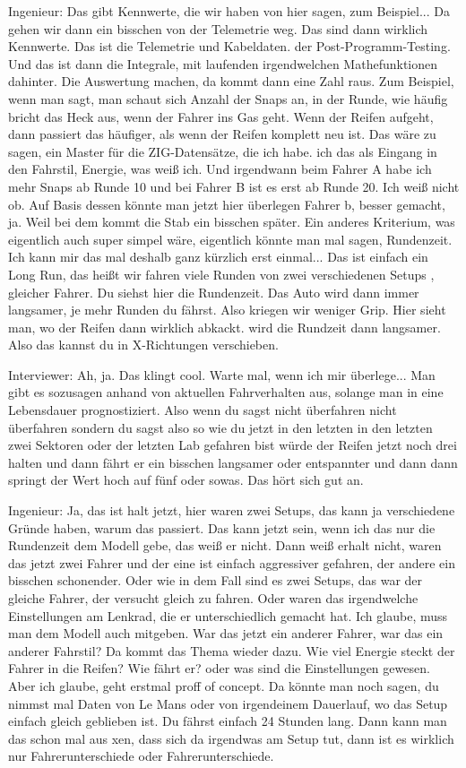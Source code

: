 Ingenieur: 
Das gibt Kennwerte, die wir haben von hier sagen, zum Beispiel...   Da gehen wir dann ein bisschen von der Telemetrie weg. Das sind dann wirklich Kennwerte. Das ist die Telemetrie und Kabeldaten. der Post-Programm-Testing. Und das ist dann die Integrale, mit laufenden irgendwelchen Mathefunktionen dahinter. Die Auswertung machen, da kommt dann eine Zahl raus. Zum Beispiel, wenn man sagt, man schaut sich Anzahl der Snaps an, in der Runde, wie häufig bricht das Heck aus, wenn der Fahrer ins Gas geht. Wenn der Reifen aufgeht, dann passiert das häufiger, als wenn der Reifen komplett neu ist.  Das wäre zu sagen, ein Master für die ZIG-Datensätze, die ich habe. ich das als Eingang in den Fahrstil, Energie, was weiß ich. Und irgendwann beim Fahrer A habe ich mehr Snaps ab Runde 10 und bei Fahrer B ist es erst ab Runde 20. Ich weiß nicht ob.  Auf Basis dessen könnte man jetzt hier überlegen Fahrer b, besser gemacht, ja. Weil bei dem kommt die Stab ein bisschen später. Ein anderes Kriterium, was eigentlich auch super simpel wäre, eigentlich könnte man mal sagen, Rundenzeit. Ich kann mir das mal deshalb ganz kürzlich erst einmal... 
Das ist einfach ein Long Run, das heißt wir fahren viele Runden von zwei verschiedenen Setups , gleicher Fahrer. Du siehst hier die Rundenzeit. Das Auto wird dann immer langsamer, je mehr Runden du fährst. Also kriegen wir weniger Grip. Hier sieht man, wo der Reifen dann wirklich abkackt. wird die Rundzeit dann langsamer. Also das kannst du in X-Richtungen verschieben.  


Interviewer:
Ah, ja. Das klingt cool. Warte mal, wenn ich mir überlege...   Man gibt es sozusagen anhand von aktuellen Fahrverhalten aus, solange man in eine Lebensdauer prognostiziert.   Also wenn du sagst nicht überfahren nicht überfahren sondern du sagst also so wie du jetzt in den letzten in den letzten zwei Sektoren oder der letzten Lab gefahren bist würde der Reifen jetzt noch drei halten und dann fährt er ein bisschen langsamer oder entspannter und dann dann springt der Wert hoch auf fünf oder sowas. Das hört sich gut an. 


Ingenieur:
Ja, das ist halt jetzt, hier waren zwei Setups, das kann ja verschiedene Gründe haben, warum das passiert. Das kann jetzt sein, wenn ich das nur die Rundenzeit dem Modell gebe, das weiß er nicht. Dann weiß erhalt nicht, waren das jetzt zwei Fahrer und der eine ist einfach aggressiver gefahren, der andere ein bisschen schonender. Oder wie in dem Fall sind es zwei Setups, das war der gleiche Fahrer, der versucht gleich zu fahren. Oder waren das irgendwelche Einstellungen am Lenkrad, die er unterschiedlich gemacht hat.  Ich glaube, muss man dem Modell auch mitgeben. War das jetzt ein anderer Fahrer, war das ein anderer Fahrstil? Da kommt das Thema wieder dazu. Wie viel Energie steckt der Fahrer in die Reifen? Wie fährt er? oder was sind die Einstellungen gewesen. Aber ich glaube, geht erstmal proff of concept. Da könnte man noch sagen, du nimmst mal Daten von Le Mans oder von irgendeinem Dauerlauf, wo das Setup einfach gleich geblieben ist. Du fährst einfach 24 Stunden lang. Dann kann man das schon mal aus xen, dass sich da irgendwas am Setup tut, dann ist es wirklich nur Fahrerunterschiede oder Fahrerunterschiede. 


